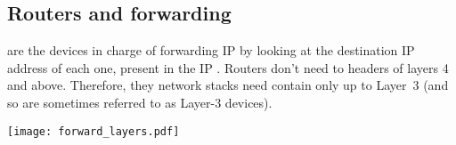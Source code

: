 \subsection{Routers and forwarding}

 are the devices in charge of forwarding IP 
by looking at the destination IP address of each one, present in the IP . Routers don't need 
to  headers of layers 4 and above. Therefore, they network stacks need contain only up to Layer~3
(and so are sometimes referred to as Layer-3 devices).

\begin{center}
\texttt{[image: forward\_layers.pdf]}
\end{center}


